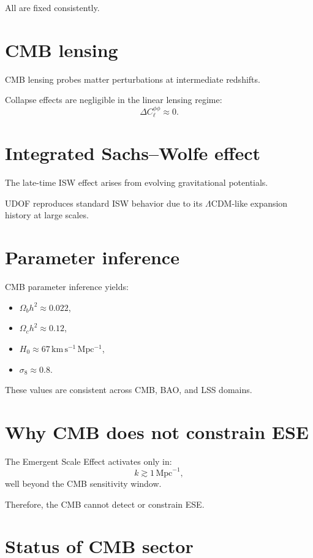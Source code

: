 \documentclass[11pt]{book}
\newcommand{\sigEight}{\sigma_8}
\begin{document}
All are fixed consistently.

\section{CMB lensing}

CMB lensing probes matter perturbations at intermediate redshifts.

Collapse effects are negligible in the linear lensing regime:
\begin{equation}
\Delta C_\ell^{\phi\phi} \approx 0.
\end{equation}

\section{Integrated Sachs--Wolfe effect}

The late-time ISW effect arises from evolving gravitational potentials.

UDOF reproduces standard ISW behavior due to its $\Lambda$CDM-like expansion
history at large scales.

\section{Parameter inference}

CMB parameter inference yields:
\begin{itemize}
\item $\Omega_b h^2 \approx 0.022$,
\item $\Omega_c h^2 \approx 0.12$,
\item $H_0 \approx 67\,\mathrm{km\,s^{-1}\,Mpc^{-1}}$,
\item $\sigEight \approx 0.8$.
\end{itemize}

These values are consistent across CMB, BAO, and LSS domains.

\section{Why CMB does not constrain ESE}

The Emergent Scale Effect activates only in:
\begin{equation}
k \gtrsim 1\,\mathrm{Mpc}^{-1},
\end{equation}
well beyond the CMB sensitivity window.

Therefore, the CMB cannot detect or constrain ESE.

\section{Status of CMB sector}
\end{document}
